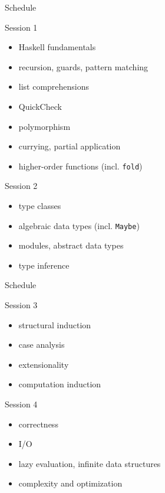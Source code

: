 \documentclass{beamer}
\def\code#1{\texttt{#1}}
\begin{document}
\begin{frame}{Schedule}

\begin{block}{Session 1}
\begin{itemize}
    \item Haskell fundamentals
    \item recursion, guards, pattern matching
    \item list comprehensions
    \item QuickCheck
    \item polymorphism
    \item currying, partial application
    \item higher-order functions (incl. \code{fold})
\end{itemize}
\end{block}

\begin{block}{Session 2}
\begin{itemize}
    \item type classes
    \item algebraic data types (incl. \code{Maybe})
    \item modules, abstract data types
    \item type inference
\end{itemize}
\end{block}

\end{frame}

\begin{frame}{Schedule}

\begin{block}{Session 3}
\begin{itemize}
    \item structural induction
    \item case analysis
    \item extensionality
    \item computation induction
\end{itemize}
\end{block}

\begin{block}{Session 4}
\begin{itemize}
    \item correctness
    \item I/O
    \item lazy evaluation, infinite data structures
    \item complexity and optimization
\end{itemize}
\end{block}

\end{frame}
\end{document}
